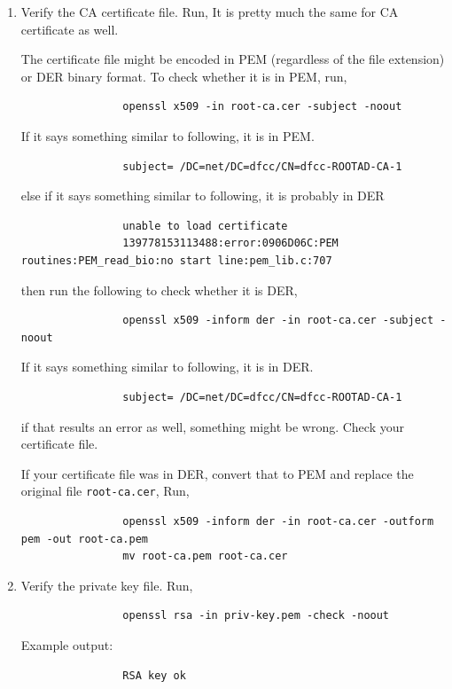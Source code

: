 \documentclass{article}
\begin{document}
\begin{enumerate}[itemsep=4ex]
\begin{enumerate}[itemsep=3ex]
            \item Verify the CA certificate file. Run,
            It is pretty much the same for CA certificate as well.


            The certificate file might be encoded in PEM (regardless of the file extension) or DER binary format. To check whether it is in PEM, run,
            \begin{lstlisting}
                openssl x509 -in root-ca.cer -subject -noout
            \end{lstlisting}
            If it says something similar to following, it is in PEM.
            \begin{lstlisting}
                subject= /DC=net/DC=dfcc/CN=dfcc-ROOTAD-CA-1
            \end{lstlisting}
            else if it says something similar to following, it is probably in DER
            \begin{lstlisting}
                unable to load certificate
                139778153113488:error:0906D06C:PEM routines:PEM_read_bio:no start line:pem_lib.c:707
            \end{lstlisting}
            then run the following to check whether it is DER,
            \begin{lstlisting}
                openssl x509 -inform der -in root-ca.cer -subject -noout
            \end{lstlisting}
            If it says something similar to following, it is in DER.
            \begin{lstlisting}
                subject= /DC=net/DC=dfcc/CN=dfcc-ROOTAD-CA-1
            \end{lstlisting}
            if that results an error as well, something might be wrong. Check your certificate file.


            If your certificate file was in DER, convert that to PEM and replace the original file \texttt{root-ca.cer}, Run,
            \begin{lstlisting}
                openssl x509 -inform der -in root-ca.cer -outform pem -out root-ca.pem
                mv root-ca.pem root-ca.cer
            \end{lstlisting}

            \item Verify the private key file. Run,
            \begin{lstlisting}
                openssl rsa -in priv-key.pem -check -noout
            \end{lstlisting}
            Example output:
            \begin{lstlisting}
                RSA key ok
            \end{lstlisting}


\end{enumerate}
\end{enumerate}
\end{document}
